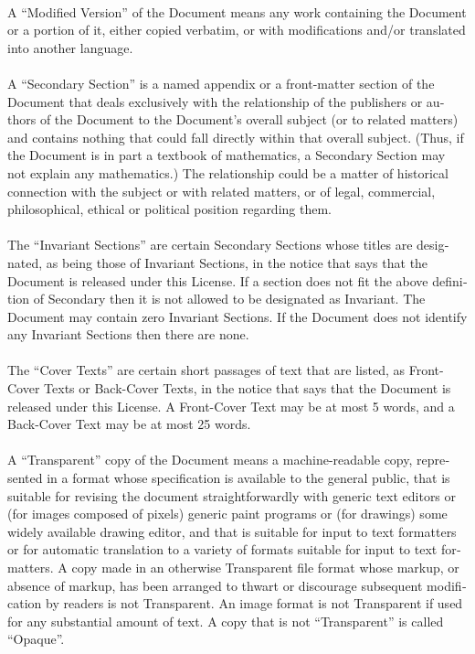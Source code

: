 \documentclass[11pt,a5paper,twoside]{book}
\begin{document}
\begin{english}
\paragraph{}A “Modified Version” of the Document means any work containing the
Document or a portion of it, either copied verbatim, or with
modifications and/or translated into another language.
\paragraph{}A “Secondary Section” is a named appendix or a front-matter section of
the Document that deals exclusively with the relationship of the
publishers or authors of the Document to the Document’s overall
subject (or to related matters) and contains nothing that could fall
directly within that overall subject.  (Thus, if the Document is in
part a textbook of mathematics, a Secondary Section may not explain
any mathematics.)  The relationship could be a matter of historical
connection with the subject or with related matters, or of legal,
commercial, philosophical, ethical or political position regarding
them.
\paragraph{}The “Invariant Sections” are certain Secondary Sections whose titles
are designated, as being those of Invariant Sections, in the notice
that says that the Document is released under this License.  If a
section does not fit the above definition of Secondary then it is not
allowed to be designated as Invariant.  The Document may contain zero
Invariant Sections.  If the Document does not identify any Invariant
Sections then there are none.
\paragraph{}The “Cover Texts” are certain short passages of text that are listed,
as Front-Cover Texts or Back-Cover Texts, in the notice that says that
the Document is released under this License.  A Front-Cover Text may
be at most 5 words, and a Back-Cover Text may be at most 25 words.
\paragraph{}A “Transparent” copy of the Document means a machine-readable copy,
represented in a format whose specification is available to the
general public, that is suitable for revising the document
straightforwardly with generic text editors or (for images composed of
pixels) generic paint programs or (for drawings) some widely available
drawing editor, and that is suitable for input to text formatters or
for automatic translation to a variety of formats suitable for input
to text formatters.  A copy made in an otherwise Transparent file
format whose markup, or absence of markup, has been arranged to thwart
or discourage subsequent modification by readers is not Transparent.
An image format is not Transparent if used for any substantial amount
of text.  A copy that is not “Transparent” is called “Opaque”.

\end{english}
\end{document}
